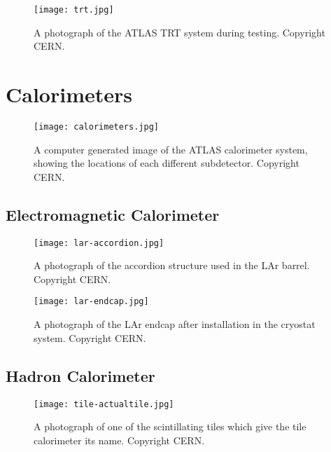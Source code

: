 
\begin{figure}
\centering
\texttt{[image: trt.jpg]}
\label{fig:detector:trt}
\caption{A photograph of the ATLAS TRT system during testing. Copyright CERN.}
\end{figure}


\section{Calorimeters}


\begin{figure}
\centering
\texttt{[image: calorimeters.jpg]}
\label{fig:detector:trt}
\caption{A computer generated image of the ATLAS calorimeter system, showing the locations of each different subdetector. Copyright CERN.}
\end{figure}



\subsection{Electromagnetic Calorimeter}


\begin{figure}
\centering
\texttt{[image: lar-accordion.jpg]}
\label{fig:detector:trt}
\caption{A photograph of the accordion structure used in the LAr barrel. Copyright CERN.}
\end{figure}



\begin{figure}
\centering
\texttt{[image: lar-endcap.jpg]}
\label{fig:detector:trt}
\caption{A photograph of the LAr endcap after installation in the cryostat system. Copyright CERN.}
\end{figure}


\subsection{Hadron Calorimeter}


\begin{figure}
\centering
\texttt{[image: tile-actualtile.jpg]}
\label{fig:detector:trt}
\caption{A photograph of one of the scintillating tiles which give the tile calorimeter its name. Copyright CERN.}
\end{figure}

